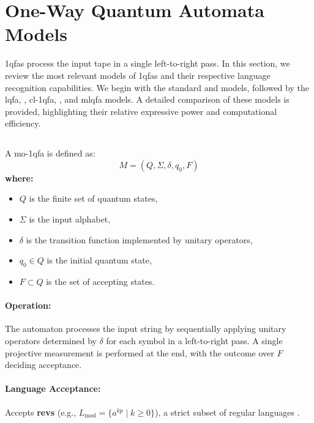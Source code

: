\section{One-Way Quantum Automata Models}
\label{sec:one-way-qfas}

\glspl{1qfa} process the input tape in a single left-to-right pass. In this section, we review the most relevant models of \glspl{1qfa} and their respective language recognition capabilities. We begin with the standard  and  models, followed by the \gls{lqfa}, , \gls{cl-1qfa}, , and \gls{mlqfa} models. A detailed comparison of these models is provided, highlighting their relative expressive power and computational efficiency.

\subsection{}
\label{subsec:mo-1qfa}
\begin{definition}
A \gls{mo-1qfa} is defined as:
\[
M = (Q, \Sigma, \delta, q_0, F)
\]
\textbf{where:}
\begin{itemize}
    \item \( Q \) is the finite set of quantum states,
    \item \( \Sigma \) is the input alphabet,
    \item \( \delta \) is the transition function implemented by unitary operators,
    \item \( q_0 \in Q \) is the initial quantum state,
    \item \( F \subset Q \) is the set of accepting states.
\end{itemize}
\end{definition}

\paragraph{Operation:}  
The automaton processes the input string by sequentially applying unitary operators determined by \( \delta \) for each symbol in a left-to-right pass. A single projective measurement is performed at the end, with the outcome over \( F \) deciding acceptance.

\paragraph{Language Acceptance:}  
Accepts \textbf{\glspl{rev}} (e.g., \( L_{\text{mod}} = \{a^{kp} \mid k \geq 0\} \)), a strict subset of regular languages \cite{kondacs1997power}.
